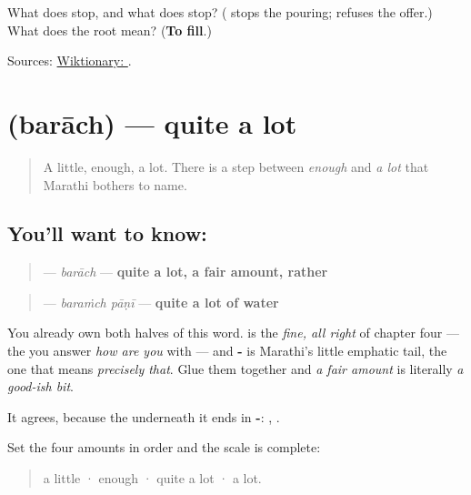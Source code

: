 \begin{tcolorbox}[breakable,colback=teal!4,colframe=teal!35!black,title={Before you move on}]
What does \textbf{} stop, and what does \textbf{} stop? (\textbf{} stops the pouring; \textbf{} refuses the offer.) What does the root \textbf{} mean? (\textbf{To fill}.)

Sources: \href{https://en.wiktionary.org/wiki/\%E0\%A4\%AA\%E0\%A5\%81\%E0\%A4\%B0\%E0\%A5\%87\%E0\%A4\%B8\%E0\%A4\%BE}{Wiktionary: }.
\end{tcolorbox}
\section[\texorpdfstring{\mr{बराच} (barāch)}{बराच (barāch)}]{ (barāch) — quite a lot}

\label{lesson:MR-C54-barach}



\begin{quote}
A little, enough, a lot. There is a step between \emph{enough} and \emph{a lot} that Marathi bothers to name.
\end{quote}

\subsection*{You'll want to know: }
\begin{quote}
\textbf{} — \emph{barāch} — \textbf{quite a lot, a fair amount, rather}
\end{quote}

\begin{quote}
\textbf{ } — \emph{baraṁch pāṇī} — \textbf{quite a lot of water}
\end{quote}

You already own both halves of this word. \textbf{} is the \emph{fine, all right} of chapter four — the \textbf{} you answer \emph{how are you} with — and \textbf{-} is Marathi's little emphatic tail, the one that means \emph{precisely that}. Glue them together and \emph{a fair amount} is literally \emph{a good-ish bit}.

It agrees, because the \textbf{} underneath it ends in \textbf{-}: \textbf{ }, \textbf{ }.

Set the four amounts in order and the scale is complete:

\begin{quote}
\textbf{} a little · \textbf{} enough · \textbf{} quite a lot · \textbf{} a lot.
\end{quote}

